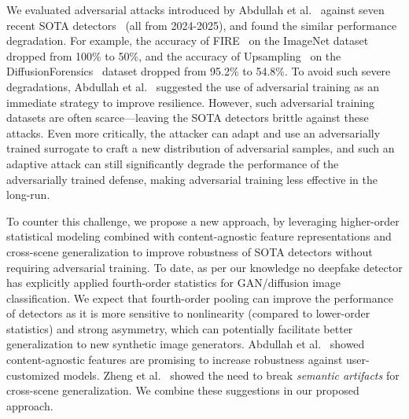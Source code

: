 \documentclass[letterpaper,twocolumn,10pt]{article}
\begin{document}
 

We evaluated adversarial attacks introduced by Abdullah et al.~\cite{Sifat2024evolvingthreat} against seven recent SOTA detectors~\cite{Karageorgiou2025anyresolution,Chu2025fire,yang2025d3,Cheng2025cospy,Brokman2025manifold,Lorch2024landscape,Tan2024upsampling} (all from 2024-2025), and found the similar performance degradation. For example, the accuracy of FIRE~\cite{Chu2025fire} on the ImageNet dataset~\cite{deng2009imagenet} dropped from 100$\%$ to 50$\%$, and the accuracy of Upsampling~\cite{Tan2024upsampling} on the DiffusionForensics~\cite{Wang2023dire} dataset dropped from 95.2$\%$ to 54.8$\%$. To avoid such severe degradations, Abdullah et al.~\cite{Sifat2024evolvingthreat} suggested the use of adversarial training as an immediate strategy to improve %
resilience. However, such adversarial 
training datasets are often scarce---leaving the SOTA 
detectors brittle against these attacks. Even more critically, the attacker can adapt and use an adversarially trained surrogate to craft a new distribution of adversarial samples, and such an adaptive attack can still significantly degrade the performance of the adversarially trained defense, making adversarial training less effective in the long-run.  
 
To counter this challenge, we propose a new approach, by  leveraging higher-order statistical modeling combined with content-agnostic feature representations and cross-scene generalization to improve robustness of SOTA detectors without requiring adversarial training. 
To date, as per our knowledge no deepfake detector has explicitly applied fourth-order statistics for GAN/diffusion image classification. We expect that fourth-order pooling can improve the performance of detectors 
as it is more sensitive to nonlinearity (compared to lower-order statistics) and strong asymmetry, 
which can potentially facilitate better generalization to new synthetic image generators. Abdullah et al.~\cite{Sifat2024evolvingthreat} showed content-agnostic features are promising to increase robustness against user-customized models. Zheng et al.~\cite{Zheng2024semanticartifacts} showed the need to break \emph{semantic artifacts} for cross-scene generalization. We combine these suggestions in our proposed approach. 
\end{document}
